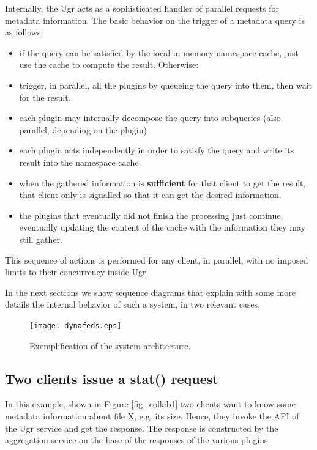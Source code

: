 \documentclass[12pt]{article} %
\begin{document}
Internally, the Ugr acts as a sophisticated handler of parallel requests for metadata information. The basic behavior on the trigger of a metadata query is as follows:
\begin{itemize}
\item if the query can be satisfied by the local in-memory namespace cache, just use the cache to compute the result. Otherwise:
\item trigger, in parallel, all the plugins by queueing the query into them, then wait for the result.
\item each plugin may internally decompose the query into subqueries (also parallel, depending on the plugin)
\item each plugin acts independently in order to satisfy the query and write its result into the namespace cache
\item when the gathered information is \textbf{sufficient} for that client to get the result, that client only is signalled so that it can get the desired information.
\item the plugins that eventually did not finish the processing just continue, eventually updating the content of the cache with the information they may still gather. 
\end{itemize}

This sequence of actions is performed for any client, in parallel, with no imposed limits to their concurrency inside Ugr.

In the next sections we show sequence diagrams that explain with some more details the internal behavior of such a system, in two relevant cases.

\begin{figure}
\begin{center}
\texttt{[image: dynafeds.eps]}
\end{center}
\caption{\label{fig_dynafeds1}Exemplification of the system architecture.}
\end{figure}

\subsection{Two clients issue a stat() request}

In this example, shown in Figure \ref{fig_collab1} two clients want to know some metadata information about file X, e.g. its size. Hence, they invoke the API of the Ugr service and get the response. The response is constructed by the aggregation service on the base of the responses of the various plugins.\\
\end{document}
